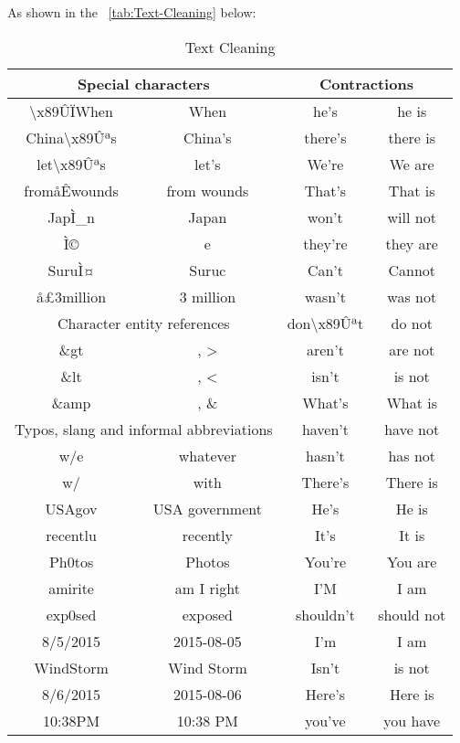As shown in the ~\cref{tab:Text-Cleaning} below:
\begin{table}[htbp]
	\centering
	\caption{Text Cleaning}
	\begin{tabular}{cccc}
		\toprule
		\multicolumn{2}{c}{Special characters} & \multicolumn{2}{c}{Contractions} \\
		\midrule
		\textbackslash{}x89ÛÏWhen &  When & he's  &  he is \\
		China\textbackslash{}x89Ûªs &  China's & there's &  there is \\
		let\textbackslash{}x89Ûªs &  let's & We're &  We are \\
		fromåÊwounds &  from wounds & That's &  That is \\
		JapÌ\_n &  Japan & won't &  will not \\
		Ì©    &  e    & they're &  they are \\
		SuruÌ¤ &  Suruc & Can't &  Cannot \\
		å£3million &  3 million & wasn't &  was not \\
		\cmidrule{1-2}    \multicolumn{2}{c}{Character entity references} & don\textbackslash{}x89Ûªt &  do not \\
		\cmidrule{1-2}    \&gt  & , >   & aren't &  are not \\
		\&lt  & , <   & isn't &  is not \\
		\&amp & , \&  & What's &  What is \\
		\cmidrule{1-2}    \multicolumn{2}{c}{Typos, slang and informal abbreviations} & haven't &  have not \\
		\cmidrule{1-2}    w/e   &  whatever & hasn't &  has not \\
		w/    &  with & There's &  There is \\
		USAgov &  USA government & He's  &  He is \\
		recentlu &  recently & It's  &  It is \\
		Ph0tos &  Photos & You're &  You are \\
		amirite &  am I right & I'M   &  I am \\
		exp0sed &  exposed & shouldn't &  should not \\
		8/5/2015 &  2015-08-05 & I'm   &  I am \\
		WindStorm &  Wind Storm & Isn't &  is not \\
		8/6/2015 &  2015-08-06 & Here's &  Here is \\
		10:38PM &  10:38 PM & you've &  you have \\

\end{tabular}
\end{table}
